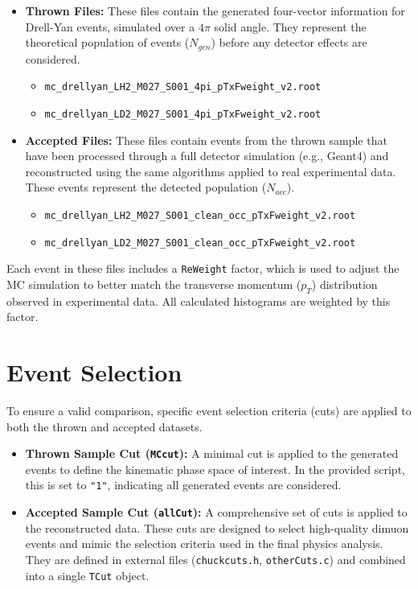 \documentclass{article}
\begin{document}
\begin{itemize}
    \item \textbf{Thrown Files:} These files contain the generated four-vector information for Drell-Yan events, simulated over a $4\pi$ solid angle. They represent the theoretical population of events ($N_{gen}$) before any detector effects are considered.
    \begin{itemize}
        \item \texttt{mc\_drellyan\_LH2\_M027\_S001\_4pi\_pTxFweight\_v2.root}
        \item \texttt{mc\_drellyan\_LD2\_M027\_S001\_4pi\_pTxFweight\_v2.root}
    \end{itemize}
    \item \textbf{Accepted Files:} These files contain events from the thrown sample that have been processed through a full detector simulation (e.g., Geant4) and reconstructed using the same algorithms applied to real experimental data. These events represent the detected population ($N_{acc}$).
    \begin{itemize}
        \item \texttt{mc\_drellyan\_LH2\_M027\_S001\_clean\_occ\_pTxFweight\_v2.root}
        \item \texttt{mc\_drellyan\_LD2\_M027\_S001\_clean\_occ\_pTxFweight\_v2.root}
    \end{itemize}
\end{itemize}
Each event in these files includes a \texttt{ReWeight} factor, which is used to adjust the MC simulation to better match the transverse momentum ($p_T$) distribution observed in experimental data. All calculated histograms are weighted by this factor.

\section{Event Selection}
To ensure a valid comparison, specific event selection criteria (cuts) are applied to both the thrown and accepted datasets.

\begin{itemize}
    \item \textbf{Thrown Sample Cut (\texttt{MCcut}):} A minimal cut is applied to the generated events to define the kinematic phase space of interest. In the provided script, this is set to \texttt{"1"}, indicating all generated events are considered.

    \item \textbf{Accepted Sample Cut (\texttt{allCut}):} A comprehensive set of cuts is applied to the reconstructed data. These cuts are designed to select high-quality dimuon events and mimic the selection criteria used in the final physics analysis. They are defined in external files (\texttt{chuckcuts.h}, \texttt{otherCuts.c}) and combined into a single \texttt{TCut} object.
\end{itemize}
\end{document}
